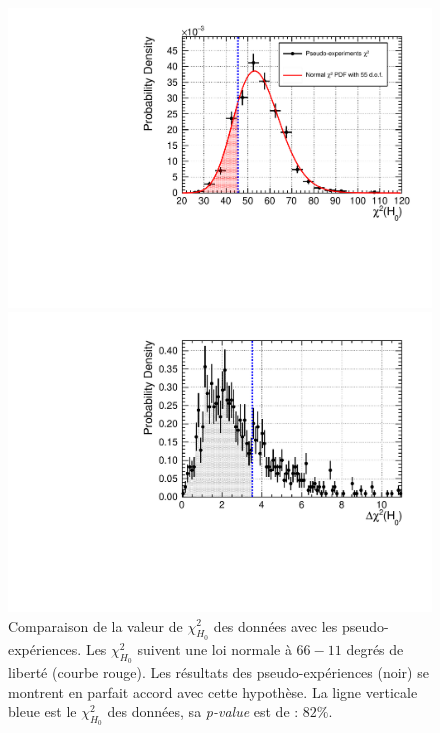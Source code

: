 {\begin{figure}[h!]
   \begin{minipage}[c]{.49\linewidth}
      \includegraphics[width=1\linewidth]{images/null_hypothesis_chi2.pdf}
      \caption[Comparaison de la valeur de $\chi^2_{H_0}$ des données avec les pseudo-expériences]{Comparaison de la valeur de $\chi^2_{H_0}$ des données avec les pseudo-expériences. Les $\chi^2_{H_0}$ suivent une loi normale à $66 - 11$ degrés de liberté (courbe rouge). Les résultats des pseudo-expériences (noir) se montrent en parfait accord avec cette hypothèse. La ligne verticale bleue est le $\chi^2_{H_0}$ des données, sa \textit{p-value} est de : $82 \%$.}
  \label{fig:null_hypothesis_chi2.pdf}
   \end{minipage} \hfill
   \begin{minipage}[c]{.49\linewidth}
      \includegraphics[width=1\linewidth]{images/null_hypothesis_delta_chi2.pdf}

\end{minipage}
\end{figure}}
